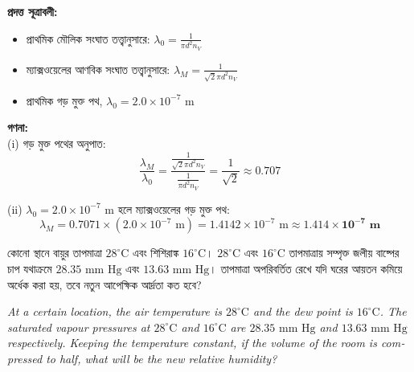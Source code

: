 \documentclass[12pt, a4paper]{article}
\begin{document}
\begin{tcolorbox}[solutionbox={সমাধান (Solution)}]
    \noindent
    \textbf{প্রদত্ত সূত্রাবলী:}
    \begin{itemize}[leftmargin=1.5em, itemsep=0.2em]
        \item প্রাথমিক মৌলিক সংঘাত তত্ত্বানুসারে: $\lambda_0 = \frac{1}{\pi d^2 n_V}$
        \item ম্যাক্সওয়েলের আণবিক সংঘাত তত্ত্বানুসারে: $\lambda_M = \frac{1}{\sqrt{2} \pi d^2 n_V}$
        \item প্রাথমিক গড় মুক্ত পথ, $\lambda_0 = 2.0 \times 10^{-7}\text{ m}$
    \end{itemize}

    \vspace{0.6em}
    \noindent\textbf{গণনা:} \\
    (i) গড় মুক্ত পথের অনুপাত:
    \[ \frac{\lambda_M}{\lambda_0} = \frac{\frac{1}{\sqrt{2} \pi d^2 n_V}}{\frac{1}{\pi d^2 n_V}} = \frac{1}{\sqrt{2}} \approx \mathbf{0.707} \]
    
    (ii) $\lambda_0 = 2.0 \times 10^{-7}\text{ m}$ হলে ম্যাক্সওয়েলের গড় মুক্ত পথ:
    \[ \lambda_M = 0.7071 \times (2.0 \times 10^{-7}\text{ m}) = 1.4142 \times 10^{-7}\text{ m} \approx \mathbf{1.414 \times 10^{-7}\text{ m}} \]
\end{tcolorbox}
\begin{tcolorbox}[questionbox={প্রশ্ন (Question) 23}]
    \noindent
    কোনো স্থানে বায়ুর তাপমাত্রা $28^\circ\text{C}$ এবং শিশিরাঙ্ক $16^\circ\text{C}$। $28^\circ\text{C}$ এবং $16^\circ\text{C}$ তাপমাত্রায় সম্পৃক্ত জলীয় বাষ্পের চাপ যথাক্রমে $28.35\text{ mm Hg}$ এবং $13.63\text{ mm Hg}$। তাপমাত্রা অপরিবর্তিত রেখে যদি ঘরের আয়তন কমিয়ে অর্ধেক করা হয়, তবে নতুন আপেক্ষিক আর্দ্রতা কত হবে?
    
    \vspace{0.8em}
    \begin{english}
    \noindent\textit{\color{darkgray}
    At a certain location, the air temperature is $28^\circ\text{C}$ and the dew point is $16^\circ\text{C}$. The saturated vapour pressures at $28^\circ\text{C}$ and $16^\circ\text{C}$ are $28.35\text{ mm Hg}$ and $13.63\text{ mm Hg}$ respectively. Keeping the temperature constant, if the volume of the room is compressed to half, what will be the new relative humidity?
    }
    \end{english}
\end{tcolorbox}
\end{document}
